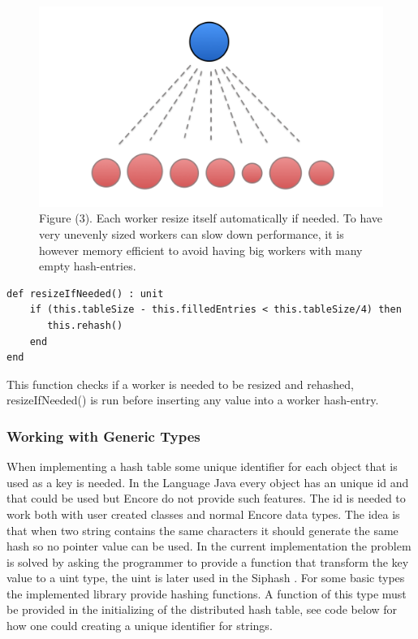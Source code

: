 \begin{figure}[h]
\includegraphics[width=12cm]{images/Resizing}
Figure (3). Each worker resize itself automatically if needed. To have very unevenly sized workers can slow down performance, it is however memory efficient to avoid having big workers with many empty hash-entries.
\end{figure}

\begin{lstlisting}
def resizeIfNeeded() : unit
    if (this.tableSize - this.filledEntries < this.tableSize/4) then
       this.rehash()
    end
end
\end{lstlisting}
This function checks if a worker is needed to be resized and rehashed, resizeIfNeeded() is run before inserting any value into a worker hash-entry.

\subsubsection{Working with Generic Types}
When implementing a hash table some unique identifier for each object that is used as a key is needed. In the Language Java every object has an unique id and that could be used but Encore do not provide such features. The id is needed to work both with user created classes and normal Encore data types. The idea is that when two string contains the same characters it should generate the same hash so no pointer value can be used. In the current implementation the problem is solved by asking the programmer to provide a function that transform the key value to a uint type, the uint is later used in the Siphash \cite{siphash}. For some basic types the implemented library provide hashing functions. A function of this type must be provided in the initializing of the distributed hash table, see code below for how one could creating a unique identifier for strings.

